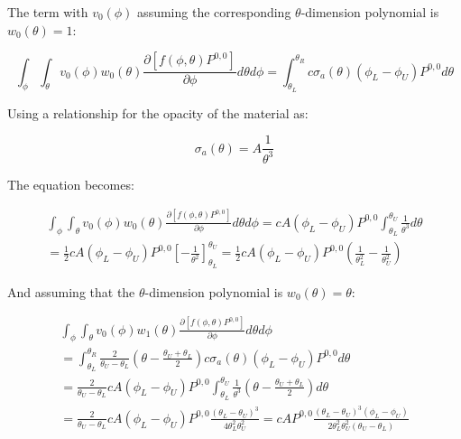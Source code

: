 \documentclass[12pt,a4paper,pagesize=pdftex]{scrartcl}
\begin{document}
The term with \(v_0\left(\phi\right)\) assuming the corresponding \(\theta\)-dimension polynomial is \(w_0\left(\theta\right) = 1\):

\begin{equation*}
    \int_\phi \int_\theta v_0\left(\phi\right) w_0\left(\theta\right) \frac{\partial \left[f\left(\phi, \theta\right)P^{0,0}\right]}{\partial \phi} d\theta d\phi = \int_{\theta_L}^{\theta_R} c \sigma_a\left(\theta\right) \left(\phi_L - \phi_U\right) P^{0,0} d \theta
\end{equation*}

Using a relationship for the opacity of the material as:

\begin{equation*}
    \sigma_a\left(\theta\right) = A \frac{1}{\theta^3}
\end{equation*}

The equation becomes:

\begin{multline*}
    \int_\phi \int_\theta v_0\left(\phi\right) w_0\left(\theta\right) \frac{\partial \left[f\left(\phi, \theta\right)P^{0,0}\right]}{\partial \phi} d\theta d\phi = cA\left(\phi_L - \phi_U\right) P^{0,0} \int_{\theta_L}^{\theta_U} \frac{1}{\theta^3} d\theta \\
    = \frac{1}{2} c A \left(\phi_L - \phi_U\right) P^{0,0} \left[-\frac{1}{\theta^2}\right]_{\theta_L}^{\theta_U} = \frac{1}{2} c A \left(\phi_L - \phi_U\right) P^{0,0} \left(\frac{1}{\theta_L^2} - \frac{1}{\theta_U^2}\right)
\end{multline*}

And assuming that the \(\theta\)-dimension polynomial is \(w_0\left(\theta\right) = \theta\):

\begin{multline*}
    \int_\phi \int_\theta v_0\left(\phi\right) w_1\left(\theta\right) \frac{\partial \left[f\left(\phi, \theta\right)P^{0,0}\right]}{\partial \phi} d\theta d\phi \\
    = \int_{\theta_L}^{\theta_R} \frac{2}{\theta_U - \theta_L}\left(\theta - \frac{\theta_U + \theta_L}{2}\right) c \sigma_a\left(\theta\right) \left(\phi_L - \phi_U\right) P^{0,0} d\theta \\
    = \frac{2}{\theta_U - \theta_L} c A \left(\phi_L - \phi_U\right) P^{0,0} \int_{\theta_L}^{\theta_U} \frac{1}{\theta^3} \left(\theta - \frac{\theta_U + \theta_L}{2}\right) d\theta \\
    = \frac{2}{\theta_U - \theta_L} c A \left(\phi_L - \phi_U\right) P^{0,0} \frac{\left(\theta_L - \theta_U\right)^3}{4 \theta_L^2 \theta_U^2}
    = c A P^{0,0} \frac{\left(\theta_L - \theta_U\right)^3\left(\phi_L - \phi_U\right)}{2 \theta_L^2 \theta_U^2 \left(\theta_U - \theta_L\right)}
\end{multline*}
\end{document}
